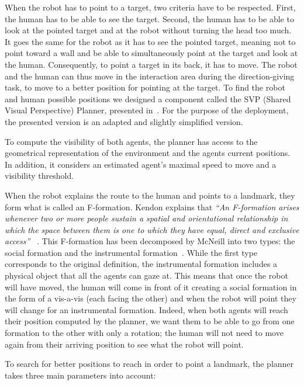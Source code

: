 \documentclass[a4paper,11pt,twoside]{StyleThese}
\begin{document}
When the robot has to point to a target, two criteria have to be respected. First, the human has to be able to see the target. Second, the human has to be able to look at the pointed target and at the robot without turning the head too much. It goes the same for the robot as it has to see the pointed target, meaning not to point toward a wall and be able to simultaneously point at the target and look at the human. Consequently, to point a target in its back, it has to move. The robot and the human can thus move in the interaction area during the direction-giving task, to move to a better position for pointing at the target. To find the robot and human possible positions we designed a component called the SVP (Shared Visual Perspective) Planner, presented in~\cite{waldhart_2019_reasoning}. For the purpose of the deployment, the presented version is an adapted and slightly simplified version.

To compute the visibility of both agents, the planner has access to the geometrical representation of the environment and the agents current positions. In addition, it considers an estimated agent's maximal speed to move and a visibility threshold.

When the robot explains the route to the human and points to a landmark, they form what is called an F-formation. Kendon explains that \emph{``An F-formation arises whenever two or more people sustain a spatial and orientational relationship in which the space between them is one to which they have equal, direct and exclusive access''} ~\cite{kendon_1990_conducting}.
This F-formation has been decomposed by McNeill into two types: the social formation and the instrumental formation~\cite{mcneill_2005_gesture}. While the first type corresponds to the original definition, the instrumental formation includes a physical object that all the agents can gaze at. This means that once the robot will have moved, the human will come in front of it creating a social formation in the form of a vis-a-vis (each facing the other) and when the robot will point they will change for an instrumental formation. Indeed, when both agents will reach their position computed by the planner, we want them to be able to go from one formation to the other with only a rotation; the human will not need to move again from their arriving position to see what the robot will point. 

To search for better positions to reach in order to point a landmark, the planner takes three main parameters into account:
\end{document}
